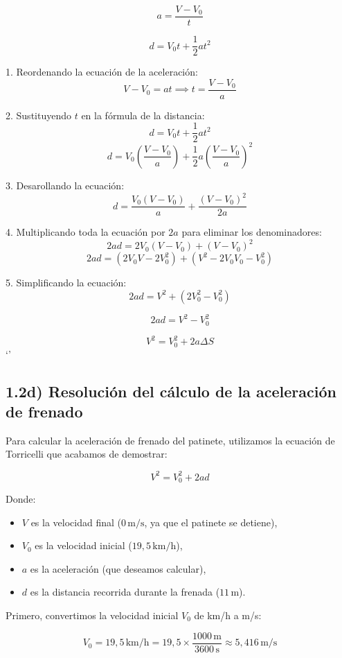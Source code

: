 \documentclass{article}
\begin{document}
\[
a = \frac{V - V_0}{t}
\]

\[
d = V_0 t + \frac{1}{2} a t^2
\]

1. Reordenando la ecuación de la aceleración:
\[
V - V_0 = a t \implies t = \frac{V - V_0}{a}
\]

2. Sustituyendo \(t\) en la fórmula de la distancia:
\[
d = V_0 t + \frac{1}{2} a t^2
\]
\[
d = V_0 \left(\frac{V - V_0}{a}\right) + \frac{1}{2} a \left(\frac{V - V_0}{a}\right)^2
\]

3. Desarollando la ecuación:
\[
d = \frac{V_0 (V - V_0)}{a} + \frac{(V - V_0)^2}{2a}
\]

4. Multiplicando toda la ecuación por \(2a\) para eliminar los denominadores:
\[
2ad = 2V_0 (V - V_0) + (V - V_0)^2
\]
\[
2ad = (2V_0 V - 2V_0^2) + (V^2 - 2V_0 V_0 - V_0^2) 
\]

5. Simplificando la ecuación:
\[
2ad = V^2 + (2V_0^2 - V_0^2) 
\]

\[
2ad = V^2 - V_0^2
\]

\[
\boxed{ V^2=     V_0^2 + 2a\Delta S }
\]
`'

\subsection*{1.2d) Resolución del cálculo de la aceleración de frenado}

Para calcular la aceleración de frenado del patinete, utilizamos la ecuación de Torricelli que acabamos de demostrar:

\[
V^2 = V_0^2 + 2ad
\]

Donde:
\begin{itemize}
    \item \(V\) es la velocidad final (\(0 \, \text{m/s}\), ya que el patinete se detiene),
    \item \(V_0\) es la velocidad inicial (\(19,5 \, \text{km/h}\)),
    \item \(a\) es la aceleración (que deseamos calcular),
    \item \(d\) es la distancia recorrida durante la frenada (\(11 \, \text{m}\)).
\end{itemize}

Primero, convertimos la velocidad inicial \(V_0\) de km/h a m/s:

\[
V_0 = 19,5 \, \text{km/h} = 19,5 \times \frac{1000 \, \text{m}}{3600 \, \text{s}} \approx 5,416 \, \text{m/s}
\]
\end{document}
